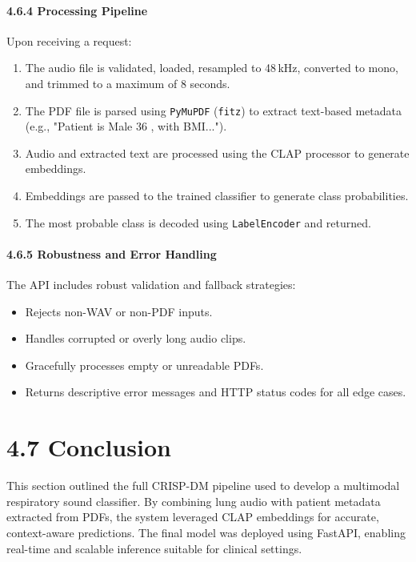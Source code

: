 \paragraph{4.6.4 Processing Pipeline\\}
Upon receiving a request:
\begin{enumerate}
    \item The audio file is validated, loaded, resampled to 48\,kHz, converted to mono, and trimmed to a maximum of 8 seconds.
    \item The PDF file is parsed using \texttt{PyMuPDF} (\texttt{fitz}) to extract text-based metadata (e.g., "Patient is Male 36 , with BMI...").
    \item Audio and extracted text are processed using the CLAP processor to generate embeddings.
    \item Embeddings are passed to the trained classifier to generate class probabilities.
    \item The most probable class is decoded using \texttt{LabelEncoder} and returned.
\end{enumerate}

\paragraph{4.6.5 Robustness and Error Handling\\}
The API includes robust validation and fallback strategies:
\begin{itemize}
    \item Rejects non-WAV or non-PDF inputs.
    \item Handles corrupted or overly long audio clips.
    \item Gracefully processes empty or unreadable PDFs.
    \item Returns descriptive error messages and HTTP status codes for all edge cases.
\end{itemize}

\section*{4.7 Conclusion}
This section outlined the full CRISP-DM pipeline used to develop a multimodal respiratory sound classifier. By combining lung audio with patient metadata extracted from PDFs, the system leveraged CLAP embeddings for accurate, context-aware predictions. The final model was deployed using FastAPI, enabling real-time and scalable inference suitable for clinical settings.
